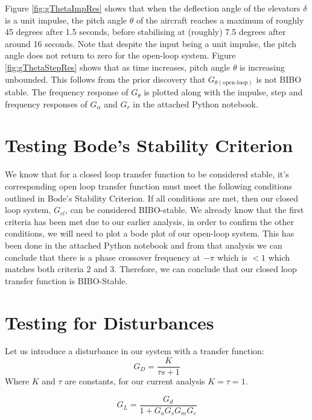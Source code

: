 \documentclass[10pt,a4paper]{article}
\begin{document}
    Figure \ref{fig:gThetaImpRes} shows that when the deflection angle of the elevators $\delta$ is a unit impulse, the pitch angle $\theta$ of the aircraft reaches a maximum of roughly 45 degrees after 1.5 seconds, before stabilising at (roughly) 7.5 degrees after around 16 seconds. Note that despite the input being a unit impulse, the pitch angle does not return to zero for the open-loop system.    Figure \ref{fig:gThetaStepRes} shows that as time increases, pitch angle $\theta$ is increasing unbounded. This follows from the prior discovery that $G_{\theta(\text{open-loop})}$ is not BIBO stable. The frequency response of $G_\theta$ is plotted along with the impulse, step and frequency responses of $G_\alpha$ and $G_r$ in the attached Python notebook.

    \section{Testing Bode's Stability Criterion}
    We know that for a closed loop transfer function to be considered stable, it's corresponding open loop transfer function must meet the following conditions outlined in Bode's Stability Criterion. If all conditions are met, then our closed loop system, $G_{cl}$, can be considered BIBO-stable. We already know that the first criteria has been met due to our earlier analysis, in order to confirm the other conditions, we will need to plot a bode plot of our open-loop system. This has been done in the attached Python notebook and from that analysis we can conclude that there is a phase crossover frequency at $-\pi$ which is $<1$ which matches both criteria 2 and 3. Therefore, we can conclude that our closed loop transfer function is BIBO-Stable.

    \section{Testing for Disturbances}
    Let us introduce a disturbance in our system with a transfer function:
    \begin{equation}
        G_D = \frac{K}{\tau s + 1}
    \end{equation}
    Where $K$ and $\tau$ are constants, for our current analysis $K = \tau =1$.

    \begin{equation}
        G_{L} = \frac{G_d}{1 + G_aG_sG_mG_c}
    \end{equation}

\end{document}
